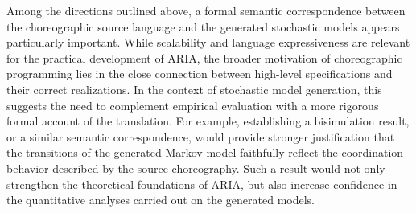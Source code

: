 Among the directions outlined above, a formal semantic correspondence between the choreographic source language and the generated stochastic models appears particularly important. While scalability and language expressiveness are relevant for the practical development of \textsc{ARIA}, the broader motivation of choreographic programming lies in the close connection between high-level specifications and their correct realizations. In the context of stochastic model generation, this suggests the need to complement empirical evaluation with a more rigorous formal account of the translation. For example, establishing a bisimulation result, or a similar semantic correspondence, would provide stronger justification that the transitions of the generated Markov model faithfully reflect the coordination behavior described by the source choreography. Such a result would not only strengthen the theoretical foundations of \textsc{ARIA}, but also increase confidence in the quantitative analyses carried out on the generated models.